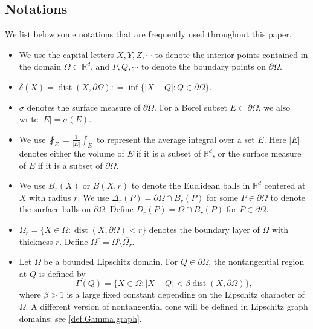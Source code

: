 \documentclass[reqno,12pt]{amsart} %
\theoremstyle{definition}
\theoremstyle{remark}
\numberwithin{equation}{section}
\newcommand{\cL}{\mathcal{L}}
\newcommand{\R}{\mathbb{R}}
\newcommand{\e}{\varepsilon}
\newcommand{\jz}[1]{\textcolor{red}{#1}}
\DeclareMathOperator{\dist}{dist}
\begin{document}

\subsection{Notations}

We list below some notations that are frequently used throughout this paper.

\begin{itemize}
    \item We use the capital letters $X, Y, Z, \cdots$ to denote the interior points contained in the domain $\Omega \subset \R^d$, and $P, Q, \cdots$ to denote the boundary points on $\partial \Omega$.

    \item $\delta(X) = \dist(X, \partial \Omega): = \inf\{ |X-Q|: Q\in \partial \Omega \}$.


    \item $\sigma$ denotes the surface measure of $\partial \Omega$. For a Borel subset $E\subset \partial \Omega$, we also write $|E| = \sigma(E).$ 

    \item We use $\fint_E = \frac{1}{|E|} \int_E$ to represent the average integral over a set $E$. Here $|E|$ denotes either the volume of $E$ if it is a subset of $\R^d$, or the surface measure of $E$ if it is a subset of $\partial \Omega$.
    
    \item We use $B_r(X)$ or $B(X,r)$ to denote the Euclidean balls in $\R^d$ centered at $X$ with radius $r$. We use $\Delta_r(P) = \partial \Omega \cap B_r(P)$ for some $P\in \partial \Omega$ to denote the surface balls on $\partial \Omega$. Define $D_r(P) = \Omega \cap B_r(P)$ for $P\in \partial \Omega$.

    \item $\Omega_r = \{X \in \Omega: \dist(X,\partial \Omega) < r \}$ denotes the boundary layer of $\Omega$ with thickness $r$. Define $\Omega^r = \Omega \setminus \overline{\Omega_r}$.

    \item Let $\Omega$ be a bounded Lipschitz domain. For $Q\in \partial \Omega$, the nontangential region at $Q$ is defined by
    \begin{equation}
        \Gamma(Q) = \{ X\in \Omega: |X-Q| < \beta \dist(X,\partial \Omega)  \},
    \end{equation}
    where $\beta>1$ is a large fixed constant depending on the Lipschitz character of $\Omega$. A different version of nontangential cone will be defined in Lipschitz graph domains; see \eqref{def.Gamma.graph}.


\end{itemize}
\end{document}
